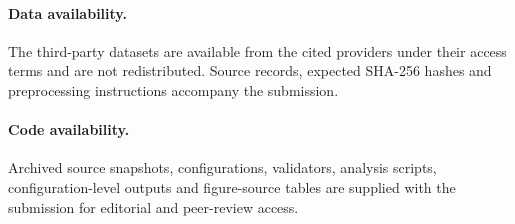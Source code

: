 \documentclass[smallextended]{svjour3}
\begin{document}
\paragraph{Data availability.} The third-party datasets are available from the cited providers under their access terms and are not redistributed. Source records, expected SHA-256 hashes and preprocessing instructions accompany the submission.
\paragraph{Code availability.} Archived source snapshots, configurations, validators, analysis scripts, configuration-level outputs and figure-source tables are supplied with the submission for editorial and peer-review access.

\end{document}
